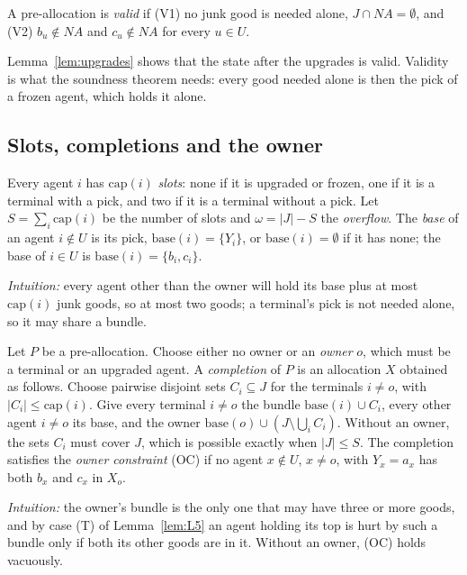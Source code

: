 \documentclass[runningheads,11pt]{llncs}
\newcommand{\NA}{\mathit{NA}}
\newcommand{\capa}{\mathrm{cap}}
\newcommand{\base}{\mathrm{base}}
\begin{document}
\begin{definition}[validity]\label{def:valid}
A pre-allocation is \emph{valid} if (V1) no junk good is needed alone, $J\cap\NA=\emptyset$, and (V2) $b_u\notin\NA$ and $c_u\notin\NA$ for every $u\in U$.
\end{definition}

\noindent Lemma~\ref{lem:upgrades} shows that the state after the upgrades is valid. Validity is what the soundness theorem needs: every good needed alone is then the pick of a frozen agent, which holds it alone.

\subsection{Slots, completions and the owner}\label{sec:slots}

\begin{definition}\label{def:slots}
Every agent $i$ has $\capa(i)$ \emph{slots}: none if it is upgraded or frozen, one if it is a terminal with a pick, and two if it is a terminal without a pick. Let $S=\sum_i\capa(i)$ be the number of slots and $\omega=|J|-S$ the \emph{overflow}. The \emph{base} of an agent $i\notin U$ is its pick, $\base(i)=\{Y_i\}$, or $\base(i)=\emptyset$ if it has none; the base of $i\in U$ is $\base(i)=\{b_i,c_i\}$.
\end{definition}

\noindent \emph{Intuition:} every agent other than the owner will hold its base plus at most $\capa(i)$ junk goods, so at most two goods; a terminal's pick is not needed alone, so it may share a bundle.

\begin{definition}[completion]\label{def:completion}
Let $P$ be a pre-allocation. Choose either no owner or an \emph{owner} $o$, which must be a terminal or an upgraded agent. A \emph{completion} of $P$ is an allocation $X$ obtained as follows. Choose pairwise disjoint sets $C_i\subseteq J$ for the terminals $i\ne o$, with $|C_i|\le\capa(i)$. Give every terminal $i\ne o$ the bundle $\base(i)\cup C_i$, every other agent $i\ne o$ its base, and the owner $\base(o)\cup(J\setminus\bigcup_iC_i)$. Without an owner, the sets $C_i$ must cover $J$, which is possible exactly when $|J|\le S$. The completion satisfies the \emph{owner constraint} (OC) if no agent $x\notin U$, $x\ne o$, with $Y_x=a_x$ has both $b_x$ and $c_x$ in $X_o$.
\end{definition}

\noindent \emph{Intuition:} the owner's bundle is the only one that may have three or more goods, and by case (T) of Lemma~\ref{lem:L5} an agent holding its top is hurt by such a bundle only if both its other goods are in it. Without an owner, (OC) holds vacuously.
\end{document}

